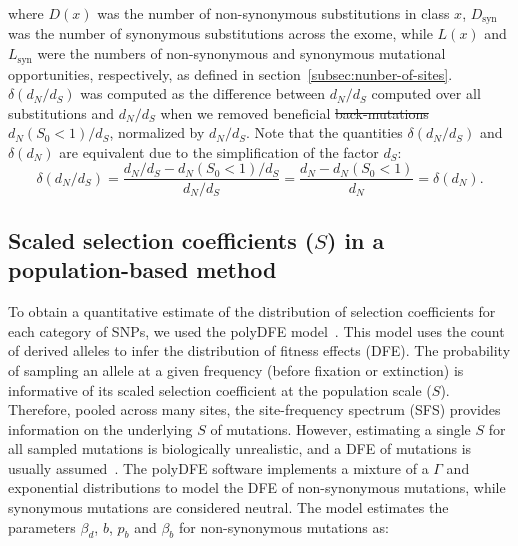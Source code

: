 \documentclass{article}
\newcommand{\dn}{d_N}
\newcommand{\ds}{d_S}
\newcommand{\dnds}{\dn / \ds}
\newcommand{\Sphy}{S_{0}}
\newcommand{\Sphyclass}{x}
\newcommand{\Spop}{S}
\newcommand{\AdvMean}{\beta_b}
\newcommand{\DelMean}{\beta_d}
\providecommand{\DIFaddtex}[1]{{\protect\color{blue}\uwave{#1}}} %
\providecommand{\DIFdeltex}[1]{{\protect\color{red}\sout{#1}}}                      %
\providecommand{\DIFaddbegin}{} %
\providecommand{\DIFaddend}{} %
\providecommand{\DIFdelbegin}{} %
\providecommand{\DIFdelend}{} %
\providecommand{\DIFadd}[1]{\texorpdfstring{\DIFaddtex{#1}}{#1}} %
\providecommand{\DIFdel}[1]{\texorpdfstring{\DIFdeltex{#1}}{}} %
\newcommand{\DIFscaledelfig}{0.5}
\newlength{\DIFdelgraphicswidth} %
\newlength{\DIFdelgraphicsheight} %
\newcommand{\DIFaddincludegraphics}[2][]{{\color{blue}\fbox{\DIFOincludegraphics[#1]{#2}}}} %
\newcommand{\DIFdelincludegraphics}[2][]{%
\sbox{\DIFdelgraphicsbox}{\DIFOincludegraphics[#1]{#2}}%
\settoboxwidth{\DIFdelgraphicswidth}{\DIFdelgraphicsbox} %
\settoboxtotalheight{\DIFdelgraphicsheight}{\DIFdelgraphicsbox} %
\scalebox{\DIFscaledelfig}{%
\parbox[b]{\DIFdelgraphicswidth}{\usebox{\DIFdelgraphicsbox}\\[-\baselineskip] \rule{\DIFdelgraphicswidth}{0em}}\llap{\resizebox{\DIFdelgraphicswidth}{\DIFdelgraphicsheight}{%
\setlength{\unitlength}{\DIFdelgraphicswidth}%
\begin{picture}(1,1)%
\thicklines\linethickness{2pt} %
{\color[rgb]{1,0,0}\put(0,0){\framebox(1,1){}}}%
{\color[rgb]{1,0,0}\put(0,0){\line( 1,1){1}}}%
{\color[rgb]{1,0,0}\put(0,1){\line(1,-1){1}}}%
\end{picture}%
}\hspace*{3pt}}} %
} %
\DeclareRobustCommand{\DIFaddbegin}{\DIFOaddbegin \let\includegraphics\DIFaddincludegraphics} %
\DeclareRobustCommand{\DIFaddend}{\DIFOaddend \let\includegraphics\DIFOincludegraphics} %
\DeclareRobustCommand{\DIFdelbegin}{\DIFOdelbegin \let\includegraphics\DIFdelincludegraphics} %
\DeclareRobustCommand{\DIFdelend}{\DIFOaddend \let\includegraphics\DIFOincludegraphics} %
\begin{document}
    where $D \left( \Sphyclass \right) $ was the number of non-synonymous substitutions in class $\Sphyclass$, $D_{\text{syn}}$ was the number of synonymous substitutions across the exome, while $L \left( \Sphyclass \right)$ and $L_{\text{syn}}$ were the numbers of non-synonymous and synonymous mutational opportunities, respectively, as defined in section~\ref{subsec:nunber-of-sites}.
    $\delta(\dnds)$ was computed as the difference between $\dnds$ computed over all substitutions and $\dnds$ when we removed beneficial \DIFdelbegin \DIFdel{back-mutations }\DIFdelend \DIFaddbegin \DIFadd{non-adaptive mutations }\DIFaddend $\dn (\Sphy < 1) / \ds$, normalized by $\dnds$.
    Note that the quantities $\delta(\dnds)$ and $\delta(\dn)$ are equivalent due to the simplification of the factor $\ds$:
    \begin{equation}
        \delta(\dnds) = \dfrac{\dnds - \dn(\Sphy < 1) / \ds}{\dnds} = \dfrac{\dn - \dn(\Sphy < 1)}{\dn} = \delta(\dn).\label{eq:delta-dnds}
    \end{equation}

    \subsection{Scaled selection coefficients ($\Spop$) in a population-based method}
    \label{subsec:s-polymorphism-method}

    To obtain a quantitative estimate of the distribution of selection coefficients for each category of SNPs, we used the polyDFE model~\cite{tataru_inference_2017, tataru_polydfe_2020}.
    This model uses the count of derived alleles to infer the distribution of fitness effects (DFE).
    The probability of sampling an allele at a given frequency (before fixation or extinction) is informative of its scaled selection coefficient at the population scale ($\Spop$).
    Therefore, pooled across many sites, the site-frequency spectrum (SFS) provides information on the underlying $\Spop$ of mutations.
    However, estimating a single $\Spop$ for all sampled mutations is biologically unrealistic, and a DFE of mutations is usually assumed~\cite{eyre-walker_distribution_2006, eyre-walker_estimating_2009}.
    The polyDFE\cite{tataru_inference_2017, tataru_polydfe_2020} software implements a mixture of a $\Gamma$ and exponential distributions to model the DFE of non-synonymous mutations, while synonymous mutations are considered neutral.
    The model estimates the parameters $\DelMean$, $b$, $p_b$ and $\AdvMean$ for non-synonymous mutations as:
\end{document}
